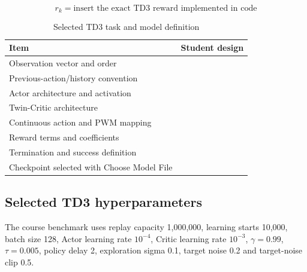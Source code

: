 \documentclass[11pt,a4paper]{article}
\begin{document}
\begin{equation}
r_k=\boxed{\text{insert the exact TD3 reward implemented in code}}
\end{equation}

\begin{table}[H]
\centering
\caption{Selected TD3 task and model definition}
\label{tab:td3design}
\begin{tabularx}{\linewidth}{p{42mm}Y}
\toprule
Item & Student design\\
\midrule
Observation vector and order & \\
Previous-action/history convention & \\
Actor architecture and activation & \\
Twin-Critic architecture & \\
Continuous action and PWM mapping & \\
Reward terms and coefficients & \\
Termination and success definition & \\
Checkpoint selected with Choose Model File & \\
\bottomrule
\end{tabularx}
\end{table}

\subsection{Selected TD3 hyperparameters}

The course benchmark uses replay capacity 1,000,000, learning starts 10,000,
batch size 128, Actor learning rate $10^{-4}$, Critic learning rate
$10^{-3}$, $\gamma=0.99$, $\tau=0.005$, policy delay 2, exploration sigma 0.1,
target noise 0.2 and target-noise clip 0.5.
\end{document}
